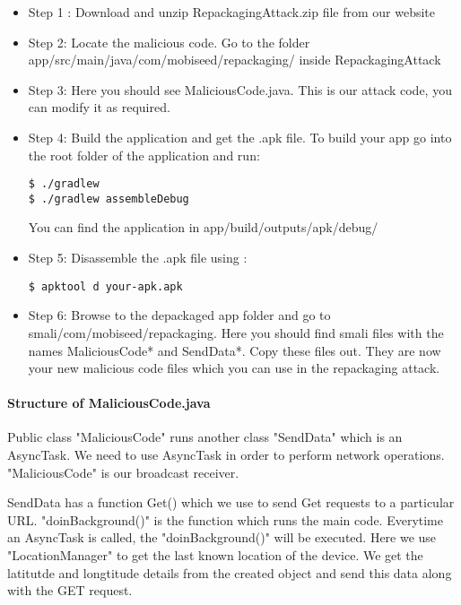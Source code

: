\begin{itemize}
\item Step 1 : Download and unzip RepackagingAttack.zip file from our website

\item Step 2: Locate the malicious code. Go to the folder
app/src/main/java/com/mobiseed/repackaging/ inside RepackagingAttack

\item Step 3: Here you should see MaliciousCode.java. This is our attack code, you can modify
it as required.

\item Step 4: Build the application and get the .apk file. To build your app go into the root
folder of the application and run: 

\begin{lstlisting}
$ ./gradlew
$ ./gradlew assembleDebug
\end{lstlisting}

You can find the application in app/build/outputs/apk/debug/

\item Step 5: Disassemble the .apk file using : 
\begin{lstlisting}
$ apktool d your-apk.apk
\end{lstlisting}
\item Step 6: Browse to the depackaged app folder and go to smali/com/mobiseed/repackaging. Here you should find smali files with the names MaliciousCode* and SendData*. Copy these files out. They are now your new malicious code files which you can use in the repackaging attack.
\end{itemize}



\paragraph{Structure of MaliciousCode.java}
Public class "MaliciousCode" runs another class "SendData" which is an AsyncTask. We need to
use AsyncTask in order to perform network operations. "MaliciousCode" is our broadcast
receiver.


SendData has a function Get() which we use to send Get requests to a particular
URL. "doinBackground()" is the function which runs the main code. Everytime an AsyncTask is
called, the  "doinBackground()" will be executed. Here we use "LocationManager" to get the last
known location of the device. We get the latitutde and longtitude details from the created
object and send this data along with the GET request.



